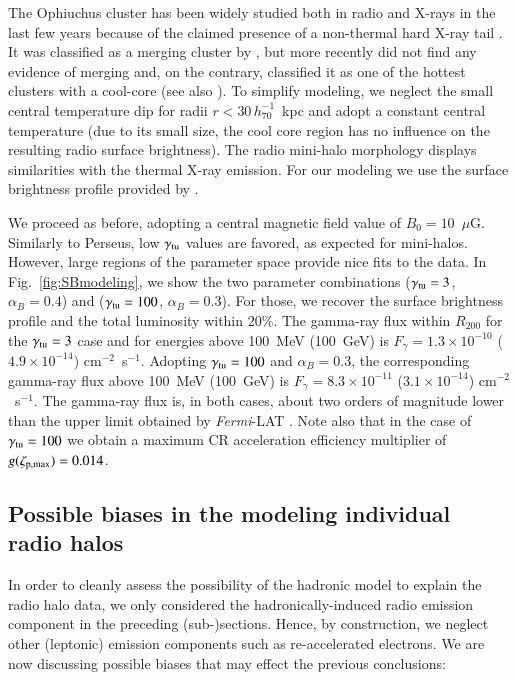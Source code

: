 \documentclass[useAMS,usenatbib]{mn2e}
\begin{document}
The Ophiuchus cluster has been widely studied both in radio and X-rays in the
last few years because of the claimed presence of a non-thermal hard X-ray tail
\citep{2008A&A...479...27E,2008PASJ...60.1133F,2009A&A...499..371G,
  2009A&A...499..679M,2009MNRAS.396.2237P,2009A&A...508.1161N,2010A&A...514A..76M,
  2010MNRAS.405.1624M}.  It was classified as a merging cluster by
\cite{2001PASJ...53..605W}, but more recently \cite{2008PASJ...60.1133F} did not
find any evidence of merging and, on the contrary, classified it as one of the
hottest clusters with a cool-core (see also \citealp{2010MNRAS.405.1624M}).  To
simplify modeling, we neglect the small central temperature dip for radii
$r<30\,h_{70}^{-1}$~kpc and adopt a constant central temperature (due to its
small size, the cool core region has no influence on the resulting radio surface
brightness).  The radio mini-halo morphology displays similarities with the
thermal X-ray emission. For our modeling we use the surface brightness profile
provided by \cite{2009A&A...499..679M}.

We proceed as before, adopting a central magnetic field value of
$B_{0}=10$~$\mu$G. Similarly to Perseus, low $\gamma_{{\mathrm{tu}}}$ values are
favored, as expected for mini-halos. However, large regions of the parameter
space provide nice fits to the data.  In Fig.~\ref{fig:SBmodeling}, we show the
two parameter combinations ($\gamma_{{\mathrm{tu}}}=3$, $\alpha_B=0.4$) and
($\gamma_{{\mathrm{tu}}}=100$, $\alpha_B=0.3$).  For those, we recover the surface
brightness profile and the total luminosity within $20\%$. The gamma-ray flux
within $R_{200}$ for the $\gamma_{{\mathrm{tu}}}=3$ case and for energies above
100~MeV (100~GeV) is $F_{\gamma} = 1.3 \times 10^{-10}$ ($4.9 \times 10^{-14}$)
cm$^{-2}$~s$^{-1}$. Adopting $\gamma_{{\mathrm{tu}}}=100$ and $\alpha_B=0.3$, the
corresponding gamma-ray flux above 100~MeV (100~GeV) is $F_{\gamma} = 8.3 \times
10^{-11}$ ($3.1 \times 10^{-14}$) cm$^{-2}$~s$^{-1}$. The gamma-ray flux is, in
both cases, about two orders of magnitude lower than the upper limit obtained by
\emph{Fermi}-LAT \citep{2010ApJ...717L..71A}. Note also that in the case of
$\gamma_{{\mathrm{tu}}} = 100$ we obtain a maximum CR acceleration efficiency
multiplier of $g(\zeta_{{\mathrm{p,max}}})=0.014$.


\subsection{Possible biases in the modeling individual radio halos}

In order to cleanly assess the possibility of the hadronic model to explain the
radio halo data, we only considered the hadronically-induced radio emission
component in the preceding (sub-)sections. Hence, by construction, we neglect
other (leptonic) emission components such as re-accelerated electrons. We are
now discussing possible biases that may effect the previous conclusions:
\end{document}
